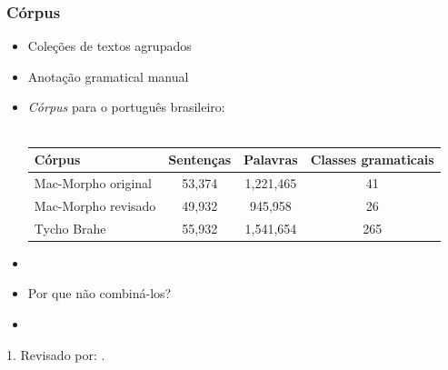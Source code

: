 \documentclass[10pt]{beamer}
\begin{document}
\begin{frame}[fragile]
  \frametitle{Córpus}

  \begin{itemize}
    \item Coleções de textos agrupados
    \item Anotação gramatical manual
    \item \textit{Córpus} para o português brasileiro:\\ \

    \begin{table}[!htb]
    \footnotesize
    \centering
    \begin{tabular}{lccc}
      \toprule
      \textbf{Córpus} & \textbf{Sentenças}  & \textbf{Palavras}  & \textbf{Classes gramaticais}  \\
      \midrule
      Mac-Morpho original & 53,374 & 1,221,465 & 41  \\
      Mac-Morpho revisado\footnotemark & 49,932 & 945,958   & 26  \\
      Tycho Brahe         & 55,932 & 1,541,654 & 265 \\
      \bottomrule
    \end{tabular}
    \end{table}

  \item[\ ] \ 
  \item Por que não combiná-los?
  \item[\ ] \ 
  \end{itemize}


{\scriptsize 1. Revisado por: .}

\end{frame}
\end{document}
